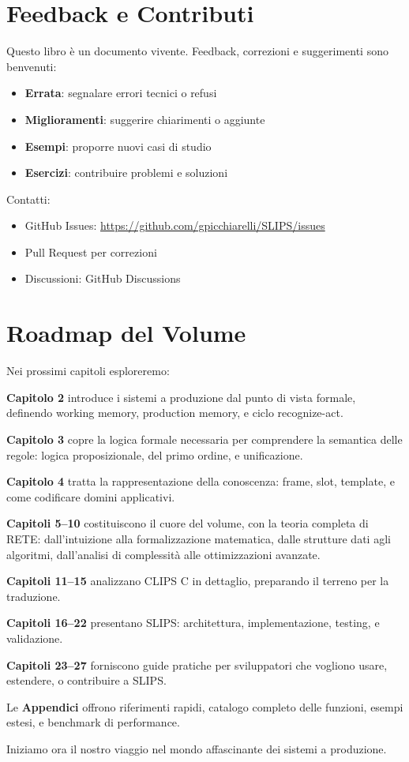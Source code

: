 \section{Feedback e Contributi}

Questo libro è un documento vivente. Feedback, correzioni e suggerimenti sono benvenuti:

\begin{itemize}
\item \textbf{Errata}: segnalare errori tecnici o refusi
\item \textbf{Miglioramenti}: suggerire chiarimenti o aggiunte
\item \textbf{Esempi}: proporre nuovi casi di studio
\item \textbf{Esercizi}: contribuire problemi e soluzioni
\end{itemize}

Contatti:
\begin{itemize}
\item GitHub Issues: \url{https://github.com/gpicchiarelli/SLIPS/issues}
\item Pull Request per correzioni
\item Discussioni: GitHub Discussions
\end{itemize}

\section{Roadmap del Volume}

Nei prossimi capitoli esploreremo:

\textbf{Capitolo 2} introduce i sistemi a produzione dal punto di vista formale, definendo working memory, production memory, e ciclo recognize-act.

\textbf{Capitolo 3} copre la logica formale necessaria per comprendere la semantica delle regole: logica proposizionale, del primo ordine, e unificazione.

\textbf{Capitolo 4} tratta la rappresentazione della conoscenza: frame, slot, template, e come codificare domini applicativi.

\textbf{Capitoli 5--10} costituiscono il cuore del volume, con la teoria completa di RETE: dall'intuizione alla formalizzazione matematica, dalle strutture dati agli algoritmi, dall'analisi di complessità alle ottimizzazioni avanzate.

\textbf{Capitoli 11--15} analizzano CLIPS C in dettaglio, preparando il terreno per la traduzione.

\textbf{Capitoli 16--22} presentano SLIPS: architettura, implementazione, testing, e validazione.

\textbf{Capitoli 23--27} forniscono guide pratiche per sviluppatori che vogliono usare, estendere, o contribuire a SLIPS.

Le \textbf{Appendici} offrono riferimenti rapidi, catalogo completo delle funzioni, esempi estesi, e benchmark di performance.

\vspace{1cm}

Iniziamo ora il nostro viaggio nel mondo affascinante dei sistemi a produzione.

